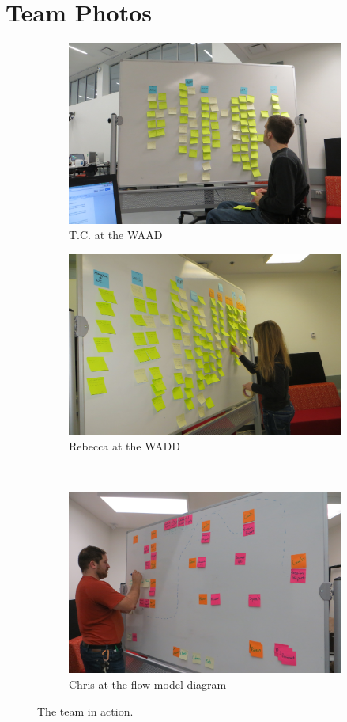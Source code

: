 \documentclass[12pt]{article} %
\begin{document}
\section{Team Photos}

\begin{figure}[H]
\begin{subfigure}{.5\linewidth}
\centering
\includegraphics[width=0.95\linewidth]{TeamAtWork1}
\caption{T.C. at the WAAD}
\label{fig:team_photo_1}
\end{subfigure}%
\begin{subfigure}{.5\linewidth}
\centering
\includegraphics[width=0.95\linewidth]{TeamAtWork3}
\caption{Rebecca at the WADD}
\label{fig:team_photo_3}
\end{subfigure}\\[1ex]
\begin{subfigure}{\linewidth}
\centering
\includegraphics[width=0.55\linewidth]{TeamAtWork4}
\caption{Chris at the flow model diagram}
\label{fig:team_photo_4}
\end{subfigure}
\caption{The team in action.}
\label{fig:test}
\end{figure}
\end{document}
